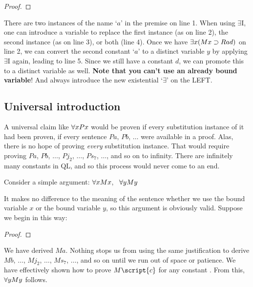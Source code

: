 \begin{proof}
	 \pr{}
	 
	 
	 
	 
	 
\end{proof}

There are two instances of the name `$a$' in the premise on line 1. When using $\exists${}I, one can introduce a variable to replace the first instance (as on line 2), the second instance (as on line 3), or both (line 4). Once we have $\exists x(Mx \supset Rad)$ on line 2, we can convert the second constant `$a$' to a distinct variable $y$ by applying $\exists${}I again, leading to line 5. Since we still have a constant $d$, we can promote this to a distinct variable as well. \textbf{Note that you can't use an already bound variable}! And always introduce the new existential `$\exists$' on the LEFT. 


\subsection{Universal introduction}
A universal claim like $\forall x Px$ would be proven if {every} substitution instance of it had been proven, if every sentence $Pa$, $Pb$, $\ldots$ were available in a proof. Alas, there is no hope of proving \emph{every} substitution instance. That would require proving $Pa$, $Pb$, $\ldots$, $Pj_2$, $\ldots$, $Ps_7$, $\ldots$, and so on to infinity. There are infinitely many constants in QL, and so this process would never come to an end.

Consider a simple argument: $\forall x Mx$, \therefore\ $\forall y My$

It makes no difference to the meaning of the sentence whether we use the bound variable $x$ or the bound variable $y$, so this argument is obviously valid. Suppose we begin in this way:

\begin{proof}
	 
	 
\end{proof}

We have derived $Ma$. Nothing stops us from using the same justification to derive $Mb$, $\ldots$, $Mj_2$, $\ldots$, $Ms_7$, $\ldots$, and so on until we run out of space or patience. We have effectively shown how to prove $M\script{c}$ for any constant . From this, $\forall y My$ follows.

